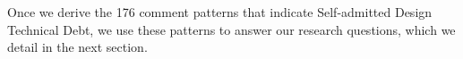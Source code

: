 \documentclass[conference]{IEEEtran}
\newcommand{\SADTD}{Self-admitted Design Technical Debt\xspace}
\begin{document}
Once we derive the 176 comment patterns that indicate \SADTD, we use these patterns to answer our research questions, which we detail in the next section.


%



\end{document}
